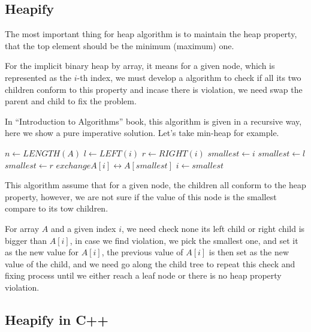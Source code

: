 \documentclass{article}
\begin{document}
\subsection{Heapify}

The most important thing for heap algorithm is to maintain the heap
property, that the top element should be the minimum (maximum) one.

For the implicit binary heap by array, it means for a given node,
which is represented as the $i$-th index, we must develop a algorithm
to check if all its two children conform to this property and incase
there is violation, we need swap the parent and child to fix the 
problem. 

In ``Introduction to Algorithms'' book\cite{CLRS}, this algorithm
is given in a recursive way, here we show a pure imperative solution.
Let's take min-heap for example.

\begin{algorithmic}[1]
  \State $n \gets LENGTH(A)$
  \Loop
    \State $l \gets LEFT(i)$
    \State $r \gets RIGHT(i)$
    \State $smallest \gets i$
      \State $smallest \gets l$
    \EndIf
      \State $smallest \gets r$
    \EndIf
      \State $exchange A[i] \leftrightarrow A[smallest]$
      \State $i \gets smallest$
    \Else
      \State \Return
    \EndIf
  \EndLoop
\EndFunction
\end{algorithmic}

This algorithm assume that for a given node, the children all conform to the heap property, however, we are not sure if the value of this node is the smallest compare to its
tow children.

For array $A$ and a given index $i$, we need check none its left child or right child
is bigger than $A[i]$, in case we find violation, we pick the smallest one, and set
it as the new value for $A[i]$, the previous value of $A[i]$ is then set as the
new value of the child, and we need go along the child tree to repeat this check and fixing
process until we either reach a leaf node or there is no heap property violation.

\subsection*{Heapify in C++}
\end{document}
